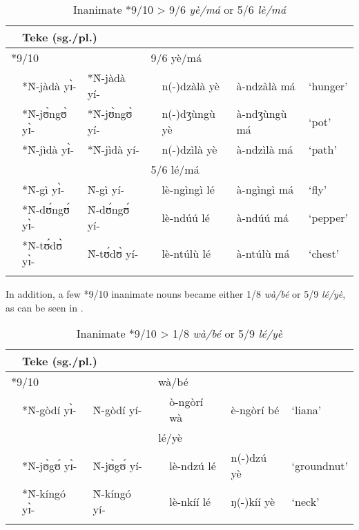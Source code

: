 \documentclass[output=paper,,modfonts,nonflat]{langsci/langscibook}
\begin{document}
\begin{table}[!htbp]
\caption{Inanimate *9/10 > 9/6 \textit{yè/má} or 5/6 \textit{lè/má}}
\label{table12}
\begin{small}
\begin{tabular}{l		l l l  		l		l		l}
\lsptoprule													
\multicolumn{3}{l}{PB (sg./pl.)}					&	\multicolumn{2}{l}{Teke (sg./pl.)}					&		\\
\midrule													
\multicolumn{2}{l}{*9/10}			&		&	\multicolumn{2}{l}{9/6 yè/má}			&		&		\\
	&	*Ǹ-jàdà yɪ̀-	&	*Ǹ-jàdà yí-	&		&	n(-)dzàlà yè	&	à-ndzàlà má	&	`hunger’	\\
	&	*Ǹ-jʊ̀ngʊ̀ yɪ̀-	&	*Ǹ-jʊ̀ngʊ̀ yí-	&		&	n(-)dʒùngù yè	&	à-ndʒùngù má	&	`pot’	\\
	&	*Ǹ-jìdà yɪ̀-	&	*Ǹ-jìdà yí-	&		&	n(-)dzìlà yè	&	à-ndzìlà má	&	`path’	\\	[0.2cm]
	&		&		&	\multicolumn{2}{l}{5/6 lé/má}			&		&		\\
	&	*Ǹ-gì yɪ̀-	&	Ǹ-gì yí-	&		&	lè-ngìngì lé	&	à-ngìngì má	&	`fly’	\\
	&	*Ǹ-dʊ́ngʊ́ yɪ̀-	&	Ǹ-dʊ́ngʊ́ yí-	&		&	lè-ndúú lé	&	à-ndúú má	&	`pepper’	\\
	&	*Ǹ-tʊ́dʊ̀ yɪ̀-	&	Ǹ-tʊ́dʊ̀ yí-	&		&	lè-ntúlù lé	&	à-ntúlù má	&	`chest’	\\
  \lspbottomrule
\end{tabular}
\end{small}
\end{table}

In addition, a few *9/10 inanimate nouns became either 1/8 \textit{wà/bé} or 5/9 \textit{lé/yè}, as can be seen in .

\begin{table}[!htbp]
\caption{Inanimate *9/10 > 1/8 \textit{wà/bé} or 5/9 \textit{lé/yè}}
\label{table13}
\begin{small}
\begin{tabular}{l		l l l  		l		l		l}
\lsptoprule	
\multicolumn{3}{l}{PB (sg./pl.)}					&	\multicolumn{2}{l}{Teke (sg./pl.)}					&		\\
\midrule													
\multicolumn{2}{l}{*9/10}			&		&	\multicolumn{2}{l}{wà/bé}			&		&		\\
	&	*Ǹ-gòdí yɪ̀-	&	Ǹ-gòdí yí-	&		&	ò-ngòrí wà	&	è-ngòrí bé	&	`liana’	\\	[0.2cm]
	&		&		&	\multicolumn{2}{l}{lé/yè}			&		&		\\
	&	*Ǹ-jʊ̀gʊ́ yɪ̀-	&	Ǹ-jʊ̀gʊ́ yí-	&		&	lè-ndzú lé	&	n(-)dzú yè	&	`groundnut’	\\
	&	*Ǹ-kíngó yɪ̀-	&	Ǹ-kíngó yí-	&		&	lè-nkíí lé	&	ŋ(-)kíí yè	&	`neck’	\\												
  \lspbottomrule
\end{tabular}
\end{small}
\end{table}
\end{document}
